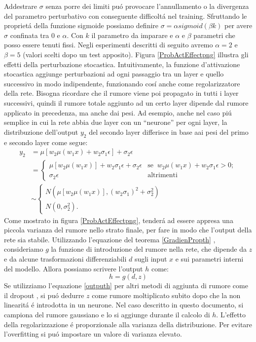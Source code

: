 \documentclass[a4paper,12pt]{report}
\begin{document}
 Addestrare $\sigma$ senza porre dei limiti pu\'o provocare l'annullamento o la divergenza del parametro perturbativo con conseguente difficolt\'a nel training. Sfruttando le propriet\'a della funzione sigmoide possiamo definire $\sigma = \alpha sigmoid(\beta k)$ per avere $\sigma$ confinata tra $0$ e $\alpha$. Con $k$ il parametro da imparare e $\alpha$ e $\beta$ parametri che posso essere tenuti fissi. Negli esperimenti descritti di seguito avremo $\alpha = 2$ e $\beta = 5$ (valori scelti dopo un test apposito). Figura \ref{ProbActEffectpng} illustra gli effetti della perturbazione stocastica. Intuitivamente, la funzione d'attivazione stocastica aggiunge perturbazioni ad ogni passaggio tra un layer e quello successivo in modo indipendente, funzionando cos\'i anche come regolarizzatore della rete. Bisogna ricordare che il rumore viene poi propagato in tutti i layer successivi, quindi il rumore totale aggiunto ad un certo layer dipende dal rumore applicato in precedenza, ma anche dai pesi. Ad esempio, anche nel caso pi\'u semplice in cui la rete abbia due layer con un ``neurone'' per ogni layer, la distribuzione dell'output $y_2$ del secondo layer differisce in base aai pesi del primo e secondo layer come segue:
 \begin{align}
  y_2 &= \mu \left[ w_2\mu\left(w_1 x\right) + w_2\sigma_1\epsilon\right] + \sigma_2\epsilon\\
  &= 
  \begin{cases}
   \mu\left[ w_2\mu\left(w_1 x\right)\right] + w_2\sigma_1\epsilon + \sigma_2\epsilon & \mbox{se} \;\; w_2\mu\left(w_1 x\right) + w_2\sigma_1\epsilon>0;\\
   \sigma_2\epsilon & \mbox{altrimenti}
  \end{cases} \\
  &\sim 
  \begin{cases}
   N\left(\mu\left[w_2\mu\left(w_1 x\right)\right],\left(w_2\sigma_1\right)^2 + \sigma_2^2\right)\\
   N\left(0,\sigma_2^2\right).
  \end{cases}
 \end{align}
 Come mostrato in figura \ref{ProbActEffectpng}, tender\'a ad essere appresa una piccola varianza del rumore nello strato finale, per fare in modo che l'output della rete sia stabile. Utilizzando l'equazione del teorema \ref{GradienPropth} , consideriamo $g$ la funzione di introduzione del rumore nella rete, che dipende da $z$ e da alcune trasformazioni differenziabili $d$ sugli input $x$ e sui parametri interni del modello. Allora possiamo scrivere l'output $h$ come:
 \begin{equation}
  h = g(d,z) \label{outputh}
 \end{equation}
 Se utilizziamo l'equazione \ref{outputh} per altri metodi di aggiunta di rumore come il dropout \cite{cai2019effective}, si pu\'o dedurre $z$  come rumore moltiplicato subito dopo che la non linearit\'a \'e introdotta in un neurone. Nel caso descritto in questo documento, si campiona del rumore gaussiano e lo si aggiunge durante il calcolo di $h$. L'effetto della regolarizzazione \'e proporzionale alla varianza della distribuzione. Per evitare l'overfitting si pu\'o impostare un valore di varianza elevato.
 
\end{document}
